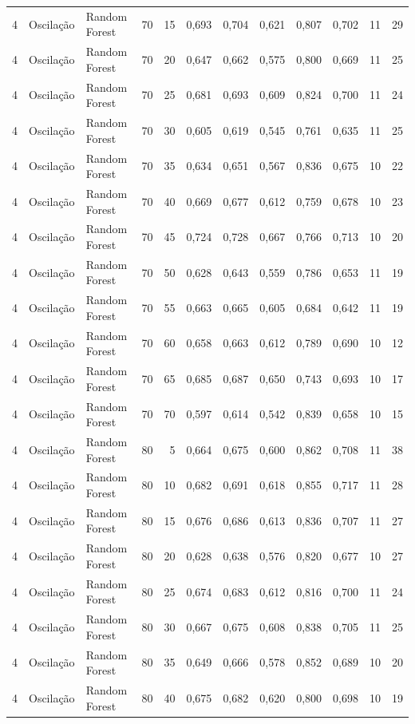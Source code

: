 \begin{longtable}{@{}rllrrrrrrrrr@{}}
4 & Oscilação & Random Forest & 70 & 15 & 0,693 & 0,704 & 0,621 & 0,807 & 0,702 & 11 & 29 \\
4 & Oscilação & Random Forest & 70 & 20 & 0,647 & 0,662 & 0,575 & 0,800 & 0,669 & 11 & 25 \\
4 & Oscilação & Random Forest & 70 & 25 & 0,681 & 0,693 & 0,609 & 0,824 & 0,700 & 11 & 24 \\
4 & Oscilação & Random Forest & 70 & 30 & 0,605 & 0,619 & 0,545 & 0,761 & 0,635 & 11 & 25 \\
4 & Oscilação & Random Forest & 70 & 35 & 0,634 & 0,651 & 0,567 & 0,836 & 0,675 & 10 & 22 \\
4 & Oscilação & Random Forest & 70 & 40 & 0,669 & 0,677 & 0,612 & 0,759 & 0,678 & 10 & 23 \\
4 & Oscilação & Random Forest & 70 & 45 & 0,724 & 0,728 & 0,667 & 0,766 & 0,713 & 10 & 20 \\
4 & Oscilação & Random Forest & 70 & 50 & 0,628 & 0,643 & 0,559 & 0,786 & 0,653 & 11 & 19 \\
4 & Oscilação & Random Forest & 70 & 55 & 0,663 & 0,665 & 0,605 & 0,684 & 0,642 & 11 & 19 \\
4 & Oscilação & Random Forest & 70 & 60 & 0,658 & 0,663 & 0,612 & 0,789 & 0,690 & 10 & 12 \\
4 & Oscilação & Random Forest & 70 & 65 & 0,685 & 0,687 & 0,650 & 0,743 & 0,693 & 10 & 17 \\
4 & Oscilação & Random Forest & 70 & 70 & 0,597 & 0,614 & 0,542 & 0,839 & 0,658 & 10 & 15 \\
4 & Oscilação & Random Forest & 80 & 5 & 0,664 & 0,675 & 0,600 & 0,862 & 0,708 & 11 & 38 \\
4 & Oscilação & Random Forest & 80 & 10 & 0,682 & 0,691 & 0,618 & 0,855 & 0,717 & 11 & 28 \\
4 & Oscilação & Random Forest & 80 & 15 & 0,676 & 0,686 & 0,613 & 0,836 & 0,707 & 11 & 27 \\
4 & Oscilação & Random Forest & 80 & 20 & 0,628 & 0,638 & 0,576 & 0,820 & 0,677 & 10 & 27 \\
4 & Oscilação & Random Forest & 80 & 25 & 0,674 & 0,683 & 0,612 & 0,816 & 0,700 & 11 & 24 \\
4 & Oscilação & Random Forest & 80 & 30 & 0,667 & 0,675 & 0,608 & 0,838 & 0,705 & 11 & 25 \\
4 & Oscilação & Random Forest & 80 & 35 & 0,649 & 0,666 & 0,578 & 0,852 & 0,689 & 10 & 20 \\
4 & Oscilação & Random Forest & 80 & 40 & 0,675 & 0,682 & 0,620 & 0,800 & 0,698 & 10 & 19 \\

\end{longtable}
